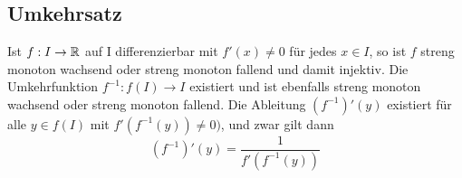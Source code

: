 \subsection{Umkehrsatz}
Ist $f:I \to \mathbb{R}$ auf I differenzierbar mit $f'(x) \neq 0$ für jedes $x \in I$,
so ist $f$ streng monoton wachsend oder streng monoton fallend und damit
injektiv. Die Umkehrfunktion $f^{-1}:f(I) \to I$ existiert und ist ebenfalls
streng monoton wachsend oder streng monoton fallend. Die Ableitung
$(f^{-1})'(y)$ existiert für alle $y \in f(I)$ mit $f'(f^{-1}(y)) \neq 0)$, und zwar gilt dann \[ (f^{-1})'(y) = \frac{1}{f'(f^{-1}(y))}
\]
